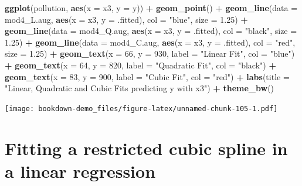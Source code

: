 \documentclass[]{book}
\newenvironment{Shaded}{\begin{snugshade}}{\end{snugshade}}
\newcommand{\KeywordTok}[1]{\textcolor[rgb]{0.13,0.29,0.53}{\textbf{#1}}}
\newcommand{\DataTypeTok}[1]{\textcolor[rgb]{0.13,0.29,0.53}{#1}}
\newcommand{\DecValTok}[1]{\textcolor[rgb]{0.00,0.00,0.81}{#1}}
\newcommand{\FloatTok}[1]{\textcolor[rgb]{0.00,0.00,0.81}{#1}}
\newcommand{\StringTok}[1]{\textcolor[rgb]{0.31,0.60,0.02}{#1}}
\newcommand{\OperatorTok}[1]{\textcolor[rgb]{0.81,0.36,0.00}{\textbf{#1}}}
\newcommand{\NormalTok}[1]{#1}
\theoremstyle{definition}
\theoremstyle{definition}
\theoremstyle{definition}
\theoremstyle{remark}
\begin{document}
\begin{Shaded}
\begin{Highlighting}[]
\KeywordTok{ggplot}\NormalTok{(pollution, }\KeywordTok{aes}\NormalTok{(}\DataTypeTok{x =}\NormalTok{ x3, }\DataTypeTok{y =}\NormalTok{ y)) }\OperatorTok{+}
\StringTok{    }\KeywordTok{geom_point}\NormalTok{() }\OperatorTok{+}
\StringTok{    }\KeywordTok{geom_line}\NormalTok{(}\DataTypeTok{data =}\NormalTok{ mod4_L.aug, }\KeywordTok{aes}\NormalTok{(}\DataTypeTok{x =}\NormalTok{ x3, }\DataTypeTok{y =}\NormalTok{ .fitted), }
              \DataTypeTok{col =} \StringTok{"blue"}\NormalTok{, }\DataTypeTok{size =} \FloatTok{1.25}\NormalTok{) }\OperatorTok{+}
\StringTok{    }\KeywordTok{geom_line}\NormalTok{(}\DataTypeTok{data =}\NormalTok{ mod4_Q.aug, }\KeywordTok{aes}\NormalTok{(}\DataTypeTok{x =}\NormalTok{ x3, }\DataTypeTok{y =}\NormalTok{ .fitted),}
              \DataTypeTok{col =} \StringTok{"black"}\NormalTok{, }\DataTypeTok{size =} \FloatTok{1.25}\NormalTok{) }\OperatorTok{+}
\StringTok{    }\KeywordTok{geom_line}\NormalTok{(}\DataTypeTok{data =}\NormalTok{ mod4_C.aug, }\KeywordTok{aes}\NormalTok{(}\DataTypeTok{x =}\NormalTok{ x3, }\DataTypeTok{y =}\NormalTok{ .fitted),}
              \DataTypeTok{col =} \StringTok{"red"}\NormalTok{, }\DataTypeTok{size =} \FloatTok{1.25}\NormalTok{) }\OperatorTok{+}
\StringTok{    }\KeywordTok{geom_text}\NormalTok{(}\DataTypeTok{x =} \DecValTok{66}\NormalTok{, }\DataTypeTok{y =} \DecValTok{930}\NormalTok{, }\DataTypeTok{label =} \StringTok{"Linear Fit"}\NormalTok{, }\DataTypeTok{col =} \StringTok{"blue"}\NormalTok{) }\OperatorTok{+}
\StringTok{    }\KeywordTok{geom_text}\NormalTok{(}\DataTypeTok{x =} \DecValTok{64}\NormalTok{, }\DataTypeTok{y =} \DecValTok{820}\NormalTok{, }\DataTypeTok{label =} \StringTok{"Quadratic Fit"}\NormalTok{, }\DataTypeTok{col =} \StringTok{"black"}\NormalTok{) }\OperatorTok{+}
\StringTok{    }\KeywordTok{geom_text}\NormalTok{(}\DataTypeTok{x =} \DecValTok{83}\NormalTok{, }\DataTypeTok{y =} \DecValTok{900}\NormalTok{, }\DataTypeTok{label =} \StringTok{"Cubic Fit"}\NormalTok{, }\DataTypeTok{col =} \StringTok{"red"}\NormalTok{) }\OperatorTok{+}
\StringTok{    }\KeywordTok{labs}\NormalTok{(}\DataTypeTok{title =} \StringTok{"Linear, Quadratic and Cubic Fits predicting y with x3"}\NormalTok{) }\OperatorTok{+}
\StringTok{    }\KeywordTok{theme_bw}\NormalTok{()}
\end{Highlighting}
\end{Shaded}

\texttt{[image: bookdown-demo\_files/figure-latex/unnamed-chunk-105-1.pdf]}

\section{Fitting a restricted cubic spline in a linear
regression}\label{fitting-a-restricted-cubic-spline-in-a-linear-regression}
\end{document}
